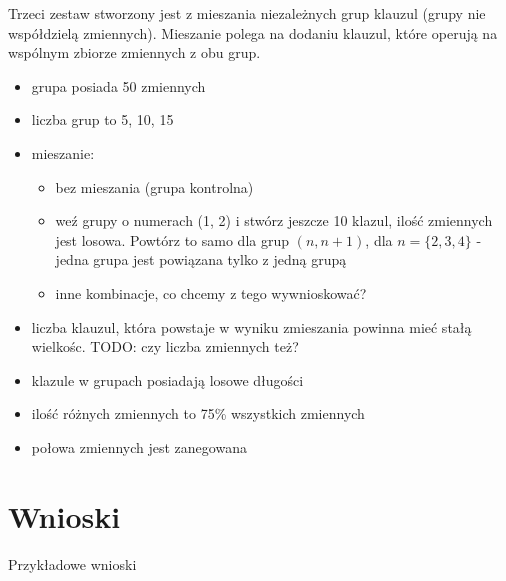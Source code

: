 \documentclass[a4paper,12pt]{article}
\begin{document}
Trzeci zestaw stworzony jest z mieszania niezależnych grup klauzul (grupy nie współdzielą zmiennych).  Mieszanie polega na dodaniu klauzul, które operują na wspólnym zbiorze zmiennych z obu grup.
\begin{itemize}
  \item grupa posiada 50 zmiennych
  \item liczba grup to 5, 10, 15
  \item mieszanie:
    \begin{itemize}
      \item bez mieszania (grupa kontrolna)
      \item weź grupy o numerach (1, 2) i stwórz jeszcze 10 klazul, ilość zmiennych jest losowa. Powtórz to samo dla grup $(n,n+1)$, dla $n=\{2,3,4\}$ - jedna grupa jest powiązana tylko z jedną grupą
      \item inne kombinacje, co chcemy z tego wywnioskować?
    \end{itemize}
  \item liczba klauzul, która powstaje w wyniku zmieszania powinna mieć stałą wielkośc. TODO: czy liczba zmiennych też?
  \item klazule w grupach posiadają losowe długości
  \item ilość różnych zmiennych to 75\% wszystkich zmiennych
  \item połowa zmiennych jest zanegowana
\end{itemize}

\section{Wnioski}

Przykładowe wnioski

\printglossary
\end{document}

